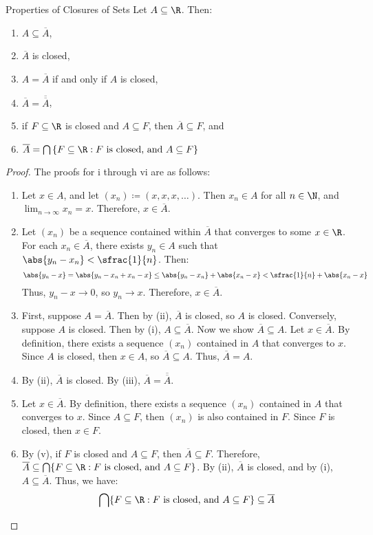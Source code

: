 \begin{thmbox}{Properties of Closures of Sets}{}
    Let $A \subseteq \R$. Then:
    \begin{enumerate}[label=(\roman*)]
        \item $A \subseteq \overline{A}$,
        \item $\overline{A}$ is closed,
        \item $A = \overline{A}$ if and only if $A$ is closed,
        \item $\overline{A} = \overline{\overline{A}}$,
        \item if $F \subseteq \R$ is closed and $A \subseteq F$, then $\overline{A} \subseteq F$, and
        \item $\overline{A} = \bigcap \left\{ F \subseteq \R : F\ \text{is closed, and}\ A \subseteq F \right\}$
    \end{enumerate}
    \tcblower
    \begin{proof}[Proof] The proofs for i through vi are as follows:
        \begin{enumerate}[label=(\roman*)]
            \item Let $x \in A$, and let $(x_n) \coloneq (x, x, x, \ldots)$. Then $x_n \in A$ for all $n \in \N$, and $\lim_{n \to \infty} x_n = x$. Therefore, $x \in \overline{A}$.
            \item Let $(x_n)$ be a sequence contained within $\overline{A}$ that converges to some $x \in \R$. For each $x_n \in \overline{A}$, there exists $y_n \in A$ such that $\abs{y_n - x_n} < \sfrac{1}{n}$. Then:
            \[ \abs{y_n - x} = \abs{y_n - x_n + x_n - x} \leq \abs{y_n - x_n} + \abs{x_n - x} < \sfrac{1}{n} + \abs{x_n - x} \]
            Thus, $y_n - x \to 0$, so $y_n \to x$. Therefore, $x \in \overline{A}$.
            \item First, suppose $A = \overline{A}$. Then by (ii), $\overline{A}$ is closed, so $A$ is closed. Conversely, suppose $A$ is closed. Then by (i), $A \subseteq \overline{A}$. Now we show $\overline{A} \subseteq A$. Let $x \in \overline{A}$. By definition, there exists a sequence $(x_n)$ contained in $A$ that converges to $x$. Since $A$ is closed, then $x \in A$, so $\overline{A} \subseteq A$. Thus, $\overline{A} = A$.
            \item By (ii), $\overline{A}$ is closed. By (iii), $\overline{A} = \overline{\overline{A}}$.
            \item Let $x \in \overline{A}$. By definition, there exists a sequence $(x_n)$ contained in $A$ that converges to $x$. Since $A \subseteq F$, then $(x_n)$ is also contained in $F$. Since $F$ is closed, then $x \in F$.
            \item By (v), if $F$ is closed and $A \subseteq F$, then $\overline{A} \subseteq F$. Therefore, $\overline{A} \subseteq \bigcap\{ F \subseteq \R : F\ \text{is closed, and}\ A \subseteq F \}$. By (ii), $\overline{A}$ is closed, and by (i), $A \subseteq \overline{A}$. Thus, we have:
            \[ \bigcap \{ F \subseteq \R : F\ \text{is closed, and}\ A \subseteq F \} \subseteq \overline{A} \]
        \end{enumerate}
    \end{proof}
\end{thmbox}

